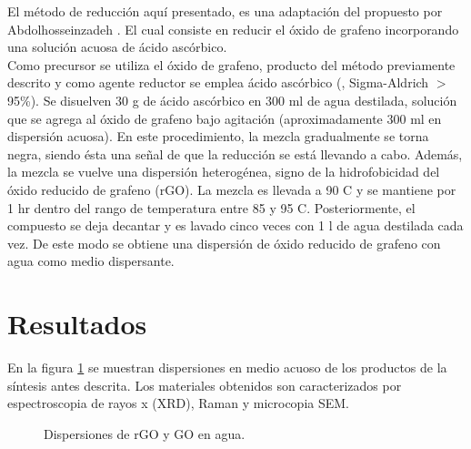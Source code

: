 El método de reducción aquí presentado, es una adaptación del propuesto por Abdolhosseinzadeh \citep{Abdolhosseinzadeh2015}. El cual consiste en reducir el óxido de grafeno incorporando una solución acuosa de ácido ascórbico.
\\
Como precursor se utiliza el óxido de grafeno, producto del método previamente descrito y como agente reductor se emplea ácido ascórbico (, Sigma-Aldrich $>$95\%). Se disuelven 30 g de ácido ascórbico en 300 ml de agua destilada, solución que se agrega al óxido de grafeno bajo agitación (aproximadamente 300 ml en dispersión acuosa). En este procedimiento, la mezcla gradualmente se torna negra, siendo ésta una señal de que la reducción se está llevando a cabo. Además, la mezcla se vuelve una dispersión heterogénea, signo de la hidrofobicidad del óxido reducido de grafeno (rGO). La mezcla es llevada a 90 \degree C y se mantiene por 1 hr dentro del rango de temperatura entre 85 y 95 \degree C. Posteriormente, el compuesto se deja decantar y es lavado cinco veces con 1 l de agua destilada cada vez. De este modo se obtiene una dispersión de óxido reducido de grafeno con agua como medio dispersante.

\section{Resultados}
En la figura \ref{fig:RGOyGO} se muestran dispersiones en medio acuoso de los productos de la síntesis antes descrita.
Los materiales obtenidos son caracterizados por espectroscopia de rayos x (XRD), Raman y microcopia SEM.

\begin{figure}[h]
	\centering
	\caption[Dispersiones de rGO y GO en agua]{Dispersiones de rGO y GO en agua.}
	\label{fig:RGOyGO}
\end{figure}

